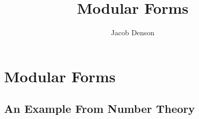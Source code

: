 

\DeclareMathOperator{\Dom}{Dom}

\title{Modular Forms}
\author{Jacob Denson}




\maketitle

\tableofcontents


\chapter{Modular Forms}

\section{An Example From Number Theory}

